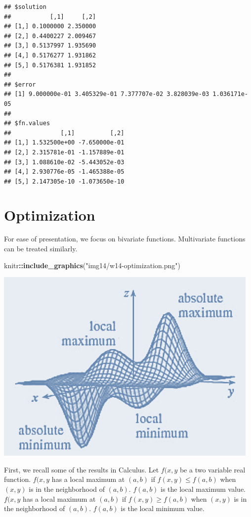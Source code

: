 \documentclass[
]{book}
\newenvironment{Shaded}{\begin{snugshade}}{\end{snugshade}}
\newcommand{\FunctionTok}[1]{\textcolor[rgb]{0.13,0.29,0.53}{\textbf{#1}}}
\newcommand{\NormalTok}[1]{#1}
\newcommand{\SpecialCharTok}[1]{\textcolor[rgb]{0.81,0.36,0.00}{\textbf{#1}}}
\newcommand{\StringTok}[1]{\textcolor[rgb]{0.31,0.60,0.02}{#1}}
\begin{document}
\begin{verbatim}
## $solution
##           [,1]     [,2]
## [1,] 0.1000000 2.350000
## [2,] 0.4400227 2.009467
## [3,] 0.5137997 1.935690
## [4,] 0.5176277 1.931862
## [5,] 0.5176381 1.931852
## 
## $error
## [1] 9.000000e-01 3.405329e-01 7.377707e-02 3.828039e-03 1.036171e-05
## 
## $fn.values
##              [,1]          [,2]
## [1,] 1.532500e+00 -7.650000e-01
## [2,] 2.315781e-01 -1.157889e-01
## [3,] 1.088610e-02 -5.443052e-03
## [4,] 2.930776e-05 -1.465388e-05
## [5,] 2.147305e-10 -1.073650e-10
\end{verbatim}

\hfill\break

\hypertarget{optimization}{%
\section{Optimization}\label{optimization}}

For ease of presentation, we focus on bivariate functions. Multivariate
functions can be treated similarly.

\begin{Shaded}
\begin{Highlighting}[]
\NormalTok{knitr}\SpecialCharTok{::}\FunctionTok{include\_graphics}\NormalTok{(}\StringTok{"img14/w14{-}optimization.png"}\NormalTok{)}
\end{Highlighting}
\end{Shaded}

\begin{center}\includegraphics[width=0.4\linewidth]{img14/w14-optimization} \end{center}

First, we recall some of the results in Calculus. Let \(f(x,y\) be a two
variable real function. \(f(x,y\) has a local maximum at \((a,b)\) if
\(f(x,y) \le f(a,b)\) when \((x,y)\) is in the neighborhood of \((a,b)\).
\(f(a,b)\) is the local maximum value. \(f(x,y\) has a local maximum at
\((a,b)\) if \(f(x,y) \ge f(a,b)\) when \((x,y)\) is in the neighborhood of
\((a,b)\). \(f(a,b)\) is the local minimum value.
\end{document}
